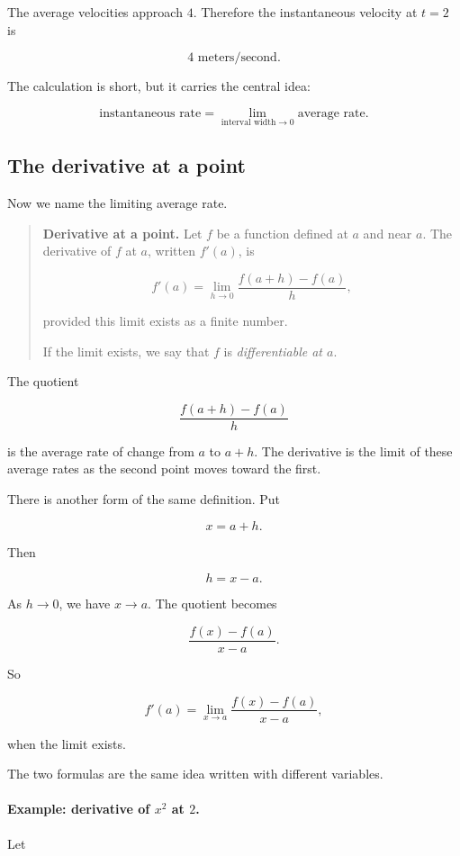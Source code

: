 The average velocities approach \(4\).  Therefore the instantaneous velocity at \(t=2\) is

\[
4\text{ meters/second}.
\]

The calculation is short, but it carries the central idea:

\[
\text{instantaneous rate}=
\lim_{\text{interval width}\to0}
\text{average rate}.
\]

\subsection{The derivative at a point}
\label{subsec:derivative-at-a-point}

Now we name the limiting average rate.

\begin{quote}
\textbf{Derivative at a point.}
Let \(f\) be a function defined at \(a\) and near \(a\).  The derivative of \(f\) at \(a\), written \(f'(a)\), is

\[
\boxed{
f'(a)=\lim_{h\to0}\frac{f(a+h)-f(a)}{h},
}
\]

provided this limit exists as a finite number.

If the limit exists, we say that \(f\) is \emph{differentiable at \(a\)}.
\end{quote}

The quotient

\[
\frac{f(a+h)-f(a)}{h}
\]

is the average rate of change from \(a\) to \(a+h\).  The derivative is the limit of these average rates as the second point moves toward the first.

There is another form of the same definition.  Put

\[
x=a+h.
\]

Then

\[
h=x-a.
\]

As \(h\to0\), we have \(x\to a\).  The quotient becomes

\[
\frac{f(x)-f(a)}{x-a}.
\]

So

\[
\boxed{
f'(a)=\lim_{x\to a}\frac{f(x)-f(a)}{x-a},
}
\]

when the limit exists.

The two formulas are the same idea written with different variables.

\paragraph{Example: derivative of \(x^2\) at \(2\).}
Let

